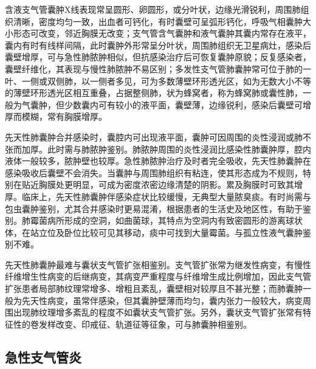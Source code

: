 含液支气管囊肿X线表现常呈圆形、卵圆形，或分叶状，边缘光滑锐利，周围肺组织清晰，密度均匀一致，出血者可钙化，有时囊壁可呈弧形钙化，呼吸气相囊肿大小形态可改变，邻近胸膜无改变；支气管含气囊肿和液气囊肿其囊内常存在液平，囊内有时有线样间隔，此时囊肿外形常呈分叶状，周围肺组织无卫星病灶，感染后囊壁增厚，可与急性肺脓肿相似，但抗感染治疗后可恢复囊肿原貌；反复感染者，囊壁纤维化，其表现与慢性肺脓肿不易区别；多发性支气管肺囊肿常可位于肺的一叶、一侧或双侧肺，以一侧者多见，可为多数薄壁环形透光区，如为无数大小不等的薄壁环形透光区相互重叠，占据整侧肺，状为蜂窝者，称为蜂窝肺或囊性肺，一般为气囊肿，但少数囊内可有较小的液平面，囊壁薄，边缘锐利，感染后囊壁可增厚而模糊，常有胸膜增厚。

先天性肺囊肿合并感染时，囊腔内可出现液平面，囊肿可因周围的炎性浸润或肺不张而加厚。此时需与肺脓肿鉴别。肺脓肿周围的炎性浸润比感染性肺囊肿厚，腔内液体一般较多，脓肿壁也较厚。急性肺脓肿治疗及时者完全吸收，先天性肺囊肿在感染吸收后囊壁不会消失。当囊肿与周围肺组织有粘连，使其形态成为不规则，特别在贴近胸膜处更明显，可成为密度浓密边缘清楚的阴影。累及胸膜时可致其增厚。临床上，先天性肺囊肿伴感染症状比较缓慢，无典型大量脓臭痰。有时尚需与包虫囊肿鉴别，尤其合并感染时更易混淆，根据患者的生活史及地区性，有助于鉴别。肺霉菌病所形成的空洞，如曲菌球，其特点为空洞内有致密圆形的游离球状体，在站立位及卧位比较可见其移动，痰中可找到大量霉菌。与孤立性液气囊肿鉴别不难。

先天性肺囊肿最难与囊状支气管扩张相鉴别。支气管扩张常为继发性病变，有慢性纤维增生性病变的后继病变，其病变严重程度与纤维增生成比例增加，因此支气管扩张患者局部肺纹理常增多、增粗且紊乱，囊壁相对较厚且不甚光整；而肺囊肿一般为先天性病变，虽常伴感染，但其囊肿壁薄而均匀，囊内张力一般较大，病变周围出现肺纹理增多紊乱的程度不如囊状支气管扩张。另外，囊状支气管扩张常有特征性的卷发样改变、印戒征、轨道征等征象，可与肺囊肿相鉴别。

\subsection{急性支气管炎}

